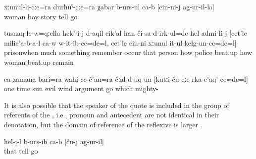 \begin{exe}

		\ex	\label{ex:He is telling his wife and his son what had happened to him@4a}
		\gll	xːunul-li-cːe=ra	durħuˁ-cːe=ra	χabar	b-urs-ul	ca-b	[cin-ni-j	ag-ur-il-la]\\
			woman	boy	story	tell			go\\
		\glt	{}	

		\ex	\label{ex:When the man was in prison he remembered a lot, how the police beat}
		\gll	tusnaq-le-w=qːella	hek'-i-j	d-aqil	cik'al	han	či-sa-d-irk-ul=de	hel	admi-li-j	[cet'le	milic'a-b-a-l	ca-w	w-it-ib-ce=de=l,	cet'le	cin-ni	xːunul	it-ul	kelg-un-ce=de=l]\\
			prisonwhen		much	something	remember	occur	that	person	how	police		beat.up	how		woman	beat.up	remain\\
		\glt	{}	

	\ex	\label{ex:‎‎Once the sun and the evil wind argued about who is stronger}
	\gll	ca	zamana	bari=ra	wahi-ce	č'an=ra	čːal	d-uq-un	[kutːi	ču-cːe-rka	c'aq'-ce=de=l]\\
		one	time	sun	evil	wind	argument	go	which		mighty-\\
	\glt	{}
\end{exe}

It is also possible that the speaker of the quote is included in the group of referents of the , i.e., pronoun and antecedent are not identical in their denotation, but the domain of reference of the reflexive is larger .

\begin{exe}
	\ex	\label{ex:‎‎‎He told what had happened to them}
	\gll	hel-i-l	b-urs-ib	ca-b	[ču-j	ag-ur-il]\\
		that	tell			go\\
	\glt	{}
\end{exe}

